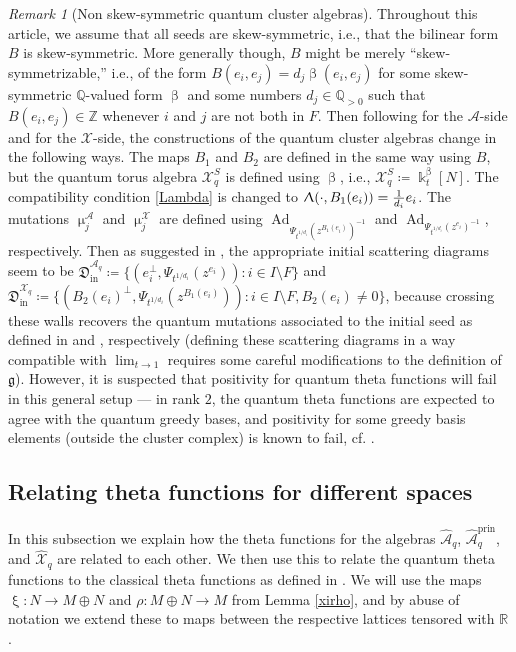 \documentclass{amsart}
\DeclareMathOperator{\prin}{prin}
\DeclareMathOperator{\In}{in}
\DeclareMathOperator{\Ad}{Ad}
\let\bb=\mathbb
\let\rar=\rightarrow
\let\f=\mathfrak
\let\s=\mathcal
\let\wh=\widehat
\newcommand {\kk} {\Bbbk}
\renewcommand{\beta}{\upbeta}
\renewcommand{\xi}{\upxi}
\renewcommand{\Lambda}{\Uplambda}
\renewcommand{\mu}{\upmu}
\theoremstyle{plain}%
\theoremstyle{definition}
\theoremstyle{remark}
\newtheorem{rmk}[thm]{Remark}
\begin{document}
\begin{rmk}[Non skew-symmetric quantum cluster algebras]\label{nonskew}
Throughout this article, we assume that all seeds are skew-symmetric, i.e., that the bilinear form $B$ is skew-symmetric.  More generally though, $B$ might be merely ``skew-symmetrizable,'' i.e., of the form $B(e_i,e_j)=d_j\beta(e_i,e_j)$ for some skew-symmetric $\bb{Q}$-valued form $\beta$ and some numbers $d_j\in \bb{Q}_{> 0}$ such that $B(e_i,e_j)\in \bb{Z}$ whenever $i$ and $j$ are not both in $F$.  Then following \cite{BZ} for the $\s{A}$-side and \cite{FG1} for the $\s{X}$-side, the constructions of the quantum cluster algebras change in the following ways.  The maps $B_1$ and $B_2$ are defined in the same way using $B$, but the quantum torus algebra $\s{X}_q^S$ is defined using $\beta$, i.e., $\s{X}_q^S\coloneqq \kk_t^{\beta}[N]$. The compatibility condition \eqref{Lambda} is changed to $\Lambda(\cdot,B_1(e_i))=\frac{1}{d_i}e_i$.  The mutations $\mu_j^{\s{A}}$ and $\mu_j^{\s{X}}$ are defined using 
$\Ad_{\Psi_{t^{1/d_i}}(z^{B_1(e_i)})^{-1}}$ and $\Ad_{\Psi_{t^{1/d_i}}(z^{e_i})^{-1}}$, respectively.  Then as suggested in \cite[\S 4.2]{Man3}, the appropriate initial scattering diagrams seem to be $ \f{D}^{\s{A}_q}_{\In}\coloneqq \{(e_i^{\perp},\Psi_{t^{1/d_i}}(z^{e_i}))\colon i\in I\setminus F\}$ and
$\f{D}^{\s{X}_q}_{\In}\coloneqq \{(B_2(e_i)^{\perp},\Psi_{t^{1/d_i}}(z^{B_1(e_i)}))\colon i\in I\setminus F, B_2(e_i)\neq 0\}$, because crossing these walls recovers the quantum mutations associated to the initial seed as defined in \cite{BZ} and \cite{FG1}, respectively (defining these scattering diagrams in a way compatible with $\lim_{t\rar 1}$ requires some careful modifications to the definition of $\f{g}$).  However, it is suspected that positivity for quantum theta functions will fail in this general setup --- in rank $2$, the quantum theta functions are expected to agree with the quantum greedy bases, and positivity for some greedy basis elements (outside the cluster complex) is known to fail, cf. \cite[end of \S 3]{LLRZpnas}.
\end{rmk}



\subsection{Relating theta functions for different spaces}
In this subsection we explain how the theta functions for the algebras $\wh{\s{A}}_q$, $\wh{\s{A}}_q^{\prin}$, and $\wh{\s{X}}_q$ are related to each other.  We then use this to relate the quantum theta functions to the classical theta functions as defined in \cite{GHKK}.  We will use the maps $\xi\colon N\rar M\oplus N$ and $\rho\colon  M\oplus N \rar M$ from Lemma \ref{xirho}, and by abuse of notation we extend these to maps between the respective lattices tensored with $\bb{R}$.
\end{document}
